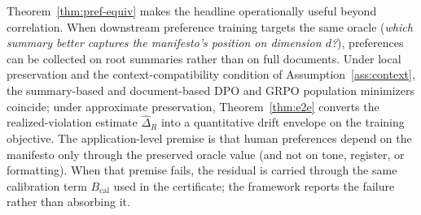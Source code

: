 Theorem~\ref{thm:pref-equiv} makes the headline operationally useful
beyond correlation. When downstream preference training targets the same
oracle (\emph{which summary better captures the manifesto's position on
dimension $d$?}), preferences can be collected on root summaries rather
than on full documents. Under local preservation and the
context-compatibility condition of Assumption~\ref{ass:context}, the
summary-based and document-based DPO and GRPO population minimizers
coincide; under approximate preservation,
Theorem~\ref{thm:e2e} converts the realized-violation estimate
$\hat{\Delta}_R$ into a quantitative drift envelope on the training
objective. The application-level premise is that human preferences
depend on the manifesto only through the preserved oracle value (and not
on tone, register, or formatting). When that premise fails, the residual
is carried through the same calibration term $B_{\mathrm{cal}}$ used in
the certificate; the framework reports the failure rather than absorbing
it.
